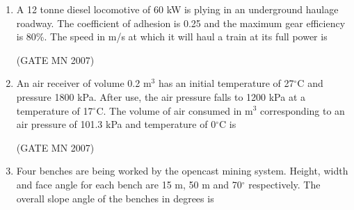 \documentclass[journal]{IEEEtran}
\begin{document}
\begin{enumerate}
\begin{multicols}{2}
	\hfill (GATE MN 2007)
\end{multicols}
\begin{enumerate}                               
\end{enumerate}


\item A 12 tonne diesel locomotive of 60 kW is plying in an underground haulage roadway. The coefficient of adhesion is 0.25 and the maximum gear efficiency is 80\%. The speed in m/s at which it will haul a train at its full power is 


	\hfill (GATE MN 2007)
\begin{enumerate}
\end{enumerate}


\item An air receiver of volume 0.2 m$^3$ has an initial temperature of 27$^\circ$C and pressure 1800 kPa. After use, the air pressure falls to 1200 kPa at a temperature of 17$^\circ$C. The volume of air consumed in m$^3$ corresponding to an air pressure of 101.3 kPa and temperature of 0$^\circ$C is  
	

	\hfill (GATE MN 2007)
\begin{enumerate}
\end{enumerate}


\item Four benches are being worked by the opencast mining system. Height, width and face angle for each bench are 15 m, 50 m and 70$^\circ$ respectively. The overall slope angle of the benches in degrees is  



\end{enumerate}
\end{document}
